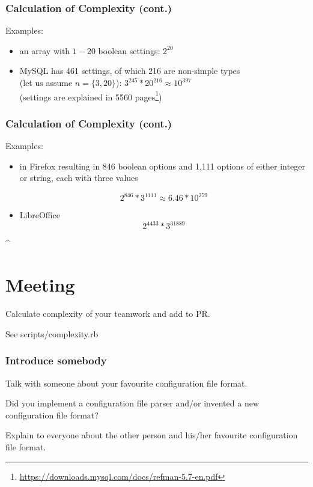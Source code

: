 \begin{frame}
	\frametitle{Calculation of Complexity (cont.)}

	Examples:
	\begin{itemize}
	\item an array with $1-20$ boolean settings:
	\pause
	$2^{20}$

	\item MySQL has 461 settings, of which 216 are non-simple types~\cite{xu2015hey} \\ (let us assume $n=\{3,20\}$):
	\pause
	$3^{245} * 20^{216} \approx 10^{397}$ \\
	(settings are explained in 5560 pages\footnote{\url{https://downloads.mysql.com/docs/refman-5.7-en.pdf}})
	\end{itemize}
\end{frame}

\begin{frame}
	\frametitle{Calculation of Complexity (cont.)~\cite{jin2014configurations}}

	Examples:
	\begin{itemize}
	\item in Firefox resulting in 846 boolean options and 1,111 options of either integer or string, each with three values

	\pause
	$$2^{846}*3^{1111} \approx 6.46 * 10^{259}$$

	\item LibreOffice
	\pause
	$$2^{4433} * 3^{31889}$$
	\end{itemize}
\end{frame}
\lstMakeShortInline[postbreak=,keywordstyle={},showspaces=no]^




\section{Meeting}

\begin{assignment}
	\begin{task}
	Calculate complexity of your teamwork and add to PR.
	\end{task}

	See scripts/complexity.rb
\end{assignment}


\begin{assignment}
	\frametitle{Introduce somebody}
	\begin{task}
	Talk with someone about your favourite configuration file format.
	\end{task}

	\begin{task}
	Did you implement a configuration file parser and/or invented a new configuration file format?
	\end{task}

	\begin{task}
	Explain to everyone about the other person and his/her favourite configuration file format.
	\end{task}
\end{assignment}


